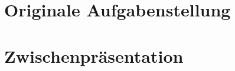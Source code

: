 \section{Originale Aufgabenstellung}\label{originaleaufgabenstellung}
%
\section{Zwischenpräsentation}\label{zwischenpraesentation}

\label{srv_v1}